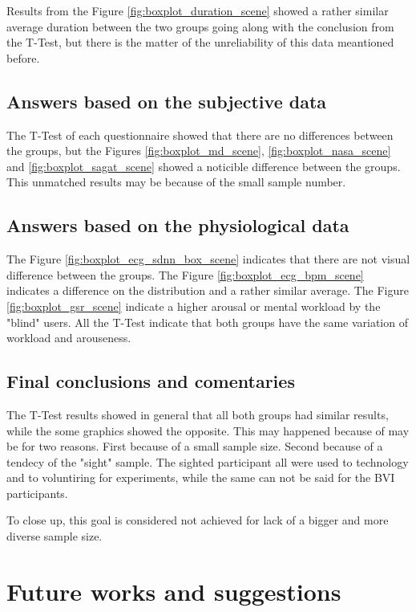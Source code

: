 Results from the Figure \ref{fig:boxplot_duration_scene} showed a rather similar average duration between the two groups going along with the conclusion from the T-Test, but there is the matter of the unreliability of this data meantioned before.

\subsection{Answers based on the subjective data}

The T-Test of each questionnaire showed that there are no differences between the groups, but the Figures \ref{fig:boxplot_md_scene}, \ref{fig:boxplot_nasa_scene} and \ref{fig:boxplot_sagat_scene} showed a noticible difference between the groups. This unmatched results may be because of the small sample number.

\subsection{Answers based on the physiological data}

The Figure \ref{fig:boxplot_ecg_sdnn_box_scene} indicates that there are not visual difference between the groups. The Figure \ref{fig:boxplot_ecg_bpm_scene} indicates a difference on the distribution and a rather similar average. The Figure \ref{fig:boxplot_gsr_scene} indicate a higher arousal or mental workload by the "blind" users. All the T-Test indicate that both groups have the same variation of workload and arouseness.

\subsection{Final conclusions and comentaries}

The T-Test results showed in general that all both groups had similar results, while the some graphics showed the opposite. This may happened because of may be for two reasons. First because of a small sample size. Second because of a tendecy of the "sight" sample. The sighted participant all were used to technology and to voluntiring for experiments, while the same can not be said for the BVI participants.

To close up, this goal is considered not achieved for lack of a bigger and more diverse sample size.


\section{Future works and suggestions}

